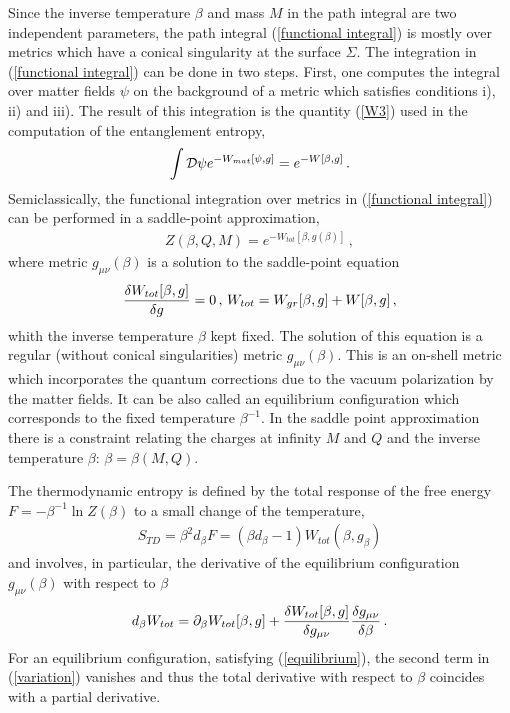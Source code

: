 \documentclass[12pt]{article}
\def\be{\begin{eqnarray}}
\def\ee{\end{eqnarray}}
\def\lb{\label}
\def\o{\over}
\begin{document}
Since the inverse temperature $\beta$ and mass $M$ in the path integral are two independent 
parameters, the path integral (\ref{functional integral}) is mostly over metrics which have a conical singularity at the surface $\Sigma$.
The integration in (\ref{functional integral}) can be done in two steps. First, one computes the integral over matter fields $\psi$ on the background of a metric which satisfies conditions i), ii) and iii).
The result of this integration is  the quantity (\ref{W3}) used in the computation of the entanglement entropy,
\be
\int {\cal D\psi} e^{-W_{mat}[\psi, g]}=e^{-W[\beta,g]}\, .
\lb{psi-integration}
\ee
Semiclassically,  the functional integration over metrics in (\ref{functional integral}) can be  performed in a saddle-point approximation,
\be
Z(\beta,Q,M)=e^{-W_{tot}[\beta,g(\beta)]}\,  ,
\lb{Z-saddle}
\ee
where metric $g_{\mu\nu}(\beta)$ is a solution to the saddle-point equation
\be
{\delta W_{tot}[\beta,g]\o \delta g}=0\, ,\, W_{tot}=W_{gr}[\beta,g]+W[\beta,g]\, ,
\lb{equilibrium}
\ee
whith the inverse temperature $\beta$ kept fixed. The solution of this equation is a regular (without conical singularities) metric $g_{\mu\nu}(\beta)$. This is an on-shell metric which incorporates the quantum corrections due to the vacuum  polarization by the matter fields.
It can be also called an equilibrium configuration which corresponds to the fixed temperature $\beta^{-1}$.
In the saddle point approximation there is a constraint relating the charges at infinity $M$ and $Q$ and the inverse temperature $\beta$: $\beta=\beta(M,Q)$.  

The thermodynamic entropy is defined  by the total response of the free energy $F=-\beta^{-1}\ln Z(\beta)$ to a small change of the temperature,
\be
S_{TD}=\beta^2d_\beta F=(\beta d_\beta
-1)W_{tot}(\beta,g_{\beta}) \lb{thermodynamical entropy}
\ee
and involves, in particular, the derivative of the equilibrium configuration $g_{\mu\nu}(\beta)$ with respect to $\beta$
\be
d_\beta W_{tot}=\partial_\beta W_{tot}[\beta, g]+{\delta W_{tot}[\beta, g]\o \delta g_{\mu\nu}}{\delta g_{\mu\nu}\o \delta\beta}\, .
\lb{variation}
\ee
For an equilibrium configuration, satisfying (\ref{equilibrium}), the second term in (\ref{variation}) vanishes and thus the total derivative with respect to $\beta$ coincides with a partial derivative.
\end{document}

